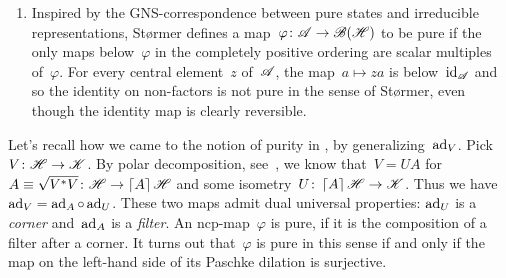 \begin{parsec}
\begin{point}
\begin{point}
\begin{enumerate}
\item
Inspired by the GNS-correspondence between pure states and
    irreducible representations,
St\o rmer defines a map~$\varphi\colon \mathscr{A} \to \mathscr{B}(\mathscr{H})$ to be pure
    if the only maps below~$\varphi$ in the completely positive ordering
    are scalar multiples of~$\varphi$.
For every central element~$z$ of~$\mathscr{A}$,
    the map~$a \mapsto za$ is below~$\operatorname{id}_{\mathscr{A}}$
    and so the identity on non-factors is not pure in the sense
        of St\o rmer,
        even though the identity map is clearly reversible.
\end{enumerate}
\end{point}
\begin{point}%
Let's recall how we came to the notion of purity in ,
    by generalizing~$\mathrm{ad}_V$.
Pick~$V \colon \mathscr{H} \to \mathscr{K}$.
    By polar decomposition, see~, we know that~$V = U A$
    for~$A \equiv \sqrt{V^*V} \colon \mathscr{H} \to \left\lceil A\right\rceil \mathscr{H}$
    and some isometry~$U \colon \left\lceil A\right\rceil \mathscr{H} \to \mathscr{K}$.
Thus we have~$\mathrm{ad}_V = \mathrm{ad}_A \mathop{\circ} \mathrm{ad}_U$.
These two maps admit dual universal properties:
    $\mathrm{ad}_U$ is a \emph{corner}
    and~$\mathrm{ad}_A$ is a \emph{filter}.
An ncp-map~$\varphi$ is pure,
    if it is the composition of a filter after a corner.
It turns out that~$\varphi$ is pure in this sense
    if and only if the map on the left-hand side of
    its Paschke dilation is surjective.
\end{point}
\end{point}
\end{parsec}

